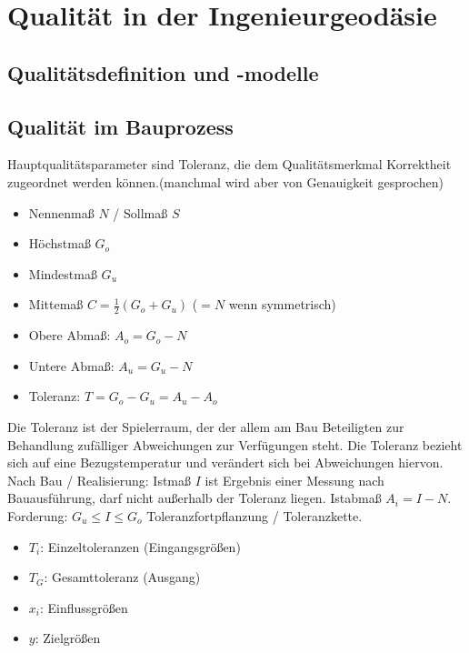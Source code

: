 \documentclass[12pt]{article}
\begin{document}
	\pagestyle{main}
\tableofcontents
\newpage
\section{Qualität in der Ingenieurgeodäsie}
\subsection{Qualitätsdefinition und -modelle}
\subsection{Qualität im Bauprozess}
Hauptqualitätsparameter sind Toleranz, die dem Qualitätsmerkmal Korrektheit zugeordnet werden können.(manchmal wird aber von Genauigkeit gesprochen) 
\begin{itemize}
\item Nennenmaß $N$ / Sollmaß $S$
\item Höchstmaß $G_o$
\item Mindestmaß $G_u$
\item Mittemaß $C = \frac{1}{2} (G_o + G_u)$ ($=N$ wenn symmetrisch)
\item Obere Abmaß: $A_o= G_o - N$
\item Untere Abmaß: $A_u = G_u - N$
\item Toleranz: $T = G_o - G_u = A_u - A_o$
\end{itemize}
Die Toleranz ist der Spielerraum, der der allem am Bau Beteiligten zur Behandlung zufälliger Abweichungen zur Verfügungen steht.\newline
Die Toleranz bezieht sich auf eine Bezugstemperatur und verändert sich bei Abweichungen hiervon.\newline
\newline
Nach Bau / Realisierung: \newline
Istmaß $I$ ist Ergebnis einer Messung nach Bauausführung, darf nicht außerhalb der Toleranz liegen. Istabmaß $A_i = I - N$.\newline
Forderung: $G_u \leq I \leq G_o$ \newline
\newline
Toleranzfortpflanzung / Toleranzkette.
\begin{itemize}
\item  $T_i$: Einzeltoleranzen (Eingangsgrößen)
\item $T_G$: Gesamttoleranz (Ausgang)
\item $x_i$: Einflussgrößen
\item $y$: Zielgrößen
\end{itemize}
\end{document}
